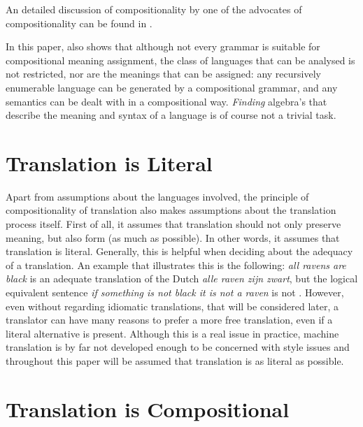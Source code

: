 \documentclass{report}
\theoremstyle{definition}
\theoremstyle{plain}
\begin{document}
An detailed discussion of compositionality by one of the advocates of compositionality can be found in \cite{janssen1996compositionality}. 



In this paper, \citeauthor{janssen1996compositionality} also shows that although not every grammar is suitable for compositional meaning assignment, the class of languages that can be analysed is not restricted, nor are the meanings that can be assigned: any recursively enumerable language can be generated by a compositional grammar, and any semantics can be dealt with in a compositional way. \textit{Finding} algebra's that describe the meaning and syntax of a language is of course not a trivial task.

\section{Translation is Literal}

Apart from assumptions about the languages involved, the principle of compositionality of translation also makes assumptions about the translation process itself. First of all, it assumes that translation should not only preserve meaning, but also form (as much as possible). In other words, it assumes that translation is literal. Generally, this is helpful when deciding about the adequacy of a translation. An example that illustrates this is the following: \textit{all ravens are black} is an adequate translation of the Dutch \textit{alle raven zijn zwart}, but the logical equivalent sentence \textit{if something is not black it is not a raven} is not \citep{landsbergen1989power}.  However, even without regarding idiomatic translations, that will be considered later, a translator can have many reasons to prefer a more free translation, even if a literal alternative is present. Although this is a real issue in practice, machine translation is by far not developed enough to be concerned with style issues and throughout this paper will be assumed that translation is as literal as possible.

\section{Translation is Compositional}
\end{document}
